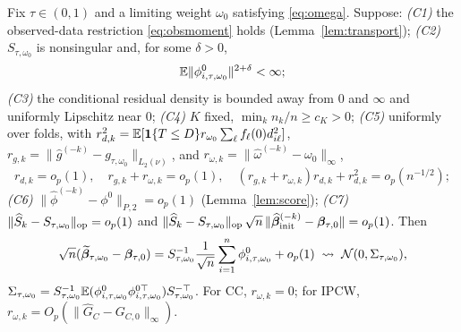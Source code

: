 \begin{theorem}\label{thm:main}
Fix $\tau\in(0,1)$ and a limiting weight $\omega_0$ satisfying \eqref{eq:omega}.
Suppose: \emph{(C1)} the observed-data restriction \eqref{eq:obsmoment} holds
(Lemma~\ref{lem:transport}); \emph{(C2)} $S_{\tau,\omega_0}$ is nonsingular and,
for some $\delta>0$,
\begin{equation}
\mathbb{E}\|\phi^0_{i,\tau,\omega_0}\|^{2+\delta}<\infty;
\label{eq:moment}
\end{equation}
\emph{(C3)} the conditional residual density is bounded away from $0$ and
$\infty$ and uniformly Lipschitz near $0$; \emph{(C4)} $K$ fixed,
$\min_k n_k/n\ge c_K>0$; \emph{(C5)} uniformly over folds, with
$r_{d,k}^2=\mathbb{E}[\mathbf{1}\{T\le D\}r_{\omega_0}\sum_\ell f_\ell(0)d_{i\ell}^2]$,
$r_{g,k}=\|\widehat g^{(-k)}-g_{\tau,\omega_0}\|_{L_2(\nu)}$, and
$r_{\omega,k}=\|\widehat\omega^{(-k)}-\omega_0\|_\infty$,
\[
r_{d,k}=o_p(1),\quad r_{g,k}+r_{\omega,k}=o_p(1),\quad
(r_{g,k}+r_{\omega,k})r_{d,k}+r_{d,k}^2=o_p(n^{-1/2});
\]
\emph{(C6)} $\|\widehat\phi^{(-k)}-\phi^0\|_{P,2}=o_p(1)$
(Lemma~\ref{lem:score}); \emph{(C7)}
$\|\widehat S_k-S_{\tau,\omega_0}\|_{\rm op}=o_p(1)$ and
$\|\widehat S_k-S_{\tau,\omega_0}\|_{\rm op}\,\sqrt n\,\|\widehat{\bm{\beta}}_{\rm init}^{(-k)}
-\bm{\beta}_{\tau,0}\|=o_p(1)$. Then
\[
\sqrt n(\widetilde{\bm{\beta}}_{\tau,\omega_0}-\bm{\beta}_{\tau,0})
=S_{\tau,\omega_0}^{-1}\frac1{\sqrt n}\sum_{i=1}^n\phi^0_{i,\tau,\omega_0}+o_p(1)
\;\rightsquigarrow\;\mathcal N(0,\Sigma_{\tau,\omega_0}),
\]
$\Sigma_{\tau,\omega_0}=S_{\tau,\omega_0}^{-1}\mathbb{E}(\phi^0_{i,\tau,\omega_0}
\phi^{0\top}_{i,\tau,\omega_0})S_{\tau,\omega_0}^{-\top}$. For CC,
$r_{\omega,k}=0$; for IPCW, $r_{\omega,k}=O_p(\|\widehat G_C-G_{C,0}\|_\infty)$.
\end{theorem}
